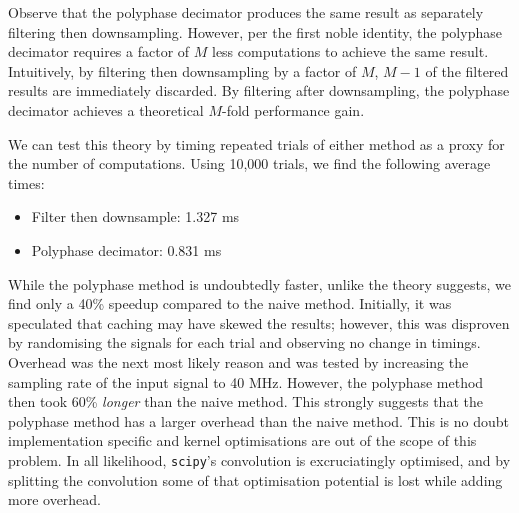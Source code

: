 Observe that the polyphase decimator produces the same result as separately filtering then downsampling. However, per the first noble identity, the polyphase decimator requires a factor of $M$ less computations to achieve the same result. Intuitively, by filtering then downsampling by a factor of $M$, $M-1$ of the filtered results are immediately discarded. By filtering after downsampling, the polyphase decimator achieves a theoretical $M$-fold performance gain.

We can test this theory by timing repeated trials of either method as a proxy for the number of computations. Using 10,000 trials, we find the following average times:
\begin{itemize}
    \item Filter then downsample: 1.327 ms
    \item Polyphase decimator: 0.831 ms
\end{itemize}
While the polyphase method is undoubtedly faster, unlike the theory suggests, we find only a 40\% speedup compared to the naive method. Initially, it was speculated that caching may have skewed the results; however, this was disproven by randomising the signals for each trial and observing no change in timings. Overhead was the next most likely reason and was tested by increasing the sampling rate of the input signal to 40 MHz. However, the polyphase method then took 60\% \textit{longer} than the naive method. This strongly suggests that the polyphase method has a larger overhead than the naive method. This is no doubt implementation specific and kernel optimisations are out of the scope of this problem. In all likelihood, \texttt{scipy}'s convolution is excruciatingly optimised, and by splitting the convolution some of that optimisation potential is lost while adding more overhead.
